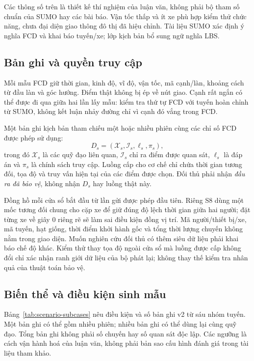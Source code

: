Các thông số trên là thiết kế thí nghiệm của luận văn, không phải bộ tham số chuẩn của SUMO hay các bài báo. Vận tốc thấp và ít xe phù hợp kiểm thử chức năng, chưa đại diện giao thông đô thị đã hiệu chỉnh. Tài liệu SUMO xác định ý nghĩa FCD và khai báo tuyến/xe; lớp kịch bản bổ sung ngữ nghĩa LBS.~\citep{sumofcd,sumovehicles}

\subsection{Bản ghi và quyền truy cập}

Mỗi mẫu FCD giữ thời gian, kinh độ, vĩ độ, vận tốc, mã cạnh/làn, khoảng cách từ đầu làn và góc hướng. Điểm thật không bị ép về nút giao. Cạnh rất ngắn có thể được đi qua giữa hai lần lấy mẫu: kiểm tra thứ tự FCD với tuyến hoàn chỉnh từ SUMO, không kết luận nhảy đường chỉ vì cạnh đó vắng trong FCD.

Một bản ghi kịch bản tham chiếu một hoặc nhiều phiên cùng các chỉ số FCD được phép sử dụng:
\[
D_s=(\mathcal X_s,\mathcal I_s,\ell_s,\pi_s),
\]
trong đó $\mathcal X_s$ là các quỹ đạo liên quan, $\mathcal I_s$ chỉ ra điểm được quan sát, $\ell_s$ là đáp án và $\pi_s$ là chính sách truy cập. Luồng cấp cho cơ chế chỉ chứa thời gian tương đối, tọa độ và truy vấn hiện tại của các điểm được chọn. Đối thủ phải nhận \emph{đầu ra đã bảo vệ}, không nhận $D_s$ hay luồng thật này.

Đồng hồ mỗi cửa sổ bắt đầu từ lần gửi được phép đầu tiên. Riêng S8 dùng một mốc tương đối chung cho cặp xe để giữ đúng độ lệch thời gian giữa hai người; đặt từng xe về giây 0 riêng rẽ sẽ làm sai điều kiện đồng vị trí. Mã người/thiết bị/xe, mã tuyến, hạt giống, thời điểm khởi hành gốc và tổng thời lượng chuyến không nằm trong giao diện. Muốn nghiên cứu đối thủ có thêm siêu dữ liệu phải khai báo chế độ khác. Kiểm thử thay tọa độ ngoài cửa sổ mà luồng được cấp không đổi chỉ xác nhận ranh giới dữ liệu của bộ phát lại; không thay thế kiểm tra nhân quả của thuật toán bảo vệ.

\subsection{Biến thể và điều kiện sinh mẫu}

Bảng~\ref{tab:scenario-subcases} nêu điều kiện và số bản ghi v2 từ sáu nhóm tuyến. Một bản ghi có thể gồm nhiều phiên; nhiều bản ghi có thể dùng lại cùng quỹ đạo. Tổng bản ghi không phải số chuyến hay số quan sát độc lập. Các ngưỡng là cách vận hành hoá của luận văn, không phải bản sao cấu hình đánh giá trong tài liệu tham khảo.

